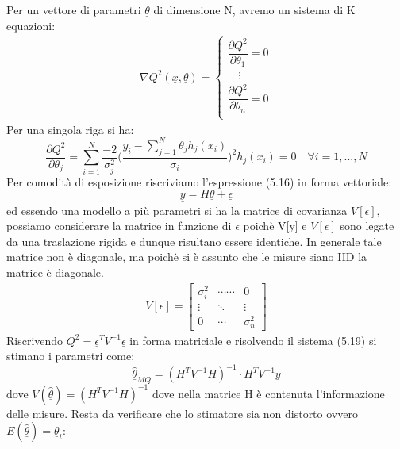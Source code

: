 Per un vettore di parametri $\underline{\theta}$ di dimensione N, avremo un sistema di K equazioni:
\begin{align}
 \nabla Q^2(\underline{x},\underline{\theta}) =
	\begin{cases}
		\dfrac{\partial Q^{2}}{\partial \theta_{1}} = 0 \\
		\quad \vdots \\
		\dfrac{\partial Q^{2}}{\partial \theta_{n}} = 0 \\
	\end{cases} 
\end{align}
Per una singola riga si ha:
\begin{equation}
	\dfrac{\partial Q^{2}}{\partial\theta_{j}} = \sum_{i=1}^N \dfrac{-2}{\sigma^2_{j}} \Big ( \dfrac{y_i - \sum_{j=1}^N \theta_j h_j(x_i)}{\sigma_i} \Big )^2h_j(x_i) = 0 \quad \forall i = 1,...,N
\end{equation}
\newline
\noindent Per comodit\`{a} di esposizione riscriviamo l'espressione (5.16) in forma vettoriale:
\begin{equation}
	\underline{y} = H \underline{\theta} + \underline{\epsilon}
\end{equation}
ed essendo una modello a pi\`{u} parametri si ha la matrice di covarianza $V[\epsilon]$, possiamo considerare la matrice in funzione di $\epsilon$ poich\`{e} V[y] e $V[\epsilon]$ sono legate da una traslazione rigida e dunque risultano essere identiche. In generale tale matrice non \`{e} diagonale, ma poich\`{e} si \`{e} assunto che le misure siano IID la matrice \`{e} diagonale.
\begin{align*}
V[\epsilon] = 
\begin{bmatrix}
	\sigma_i^2 & \cdots\cdots & 0 \\
	\vdots & \ddots & \vdots \\
	0 & \cdots & \sigma_n^2
	\end{bmatrix}
\end{align*}
Riscrivendo $Q^2 = \underline{\epsilon}^TV^{-1}\underline{\epsilon}$ in forma matriciale e risolvendo il sistema (5.19) si stimano i parametri come:
\begin{equation}
	\underline{\hat{\theta }}_{MQ} = (H^TV^{-1}H)^{-1}\cdot H^TV^{-1}\underline{y}
\end{equation}
dove $V(\underline{\hat{\theta}}) = (H^TV^{-1}H)^{-1}$ dove nella matrice H \`{e} contenuta l'informazione delle misure.\newline
\noindent Resta da verificare che lo stimatore sia non distorto ovvero $E(\underline{\hat{\theta}}) = \underline{\theta}_t$:
